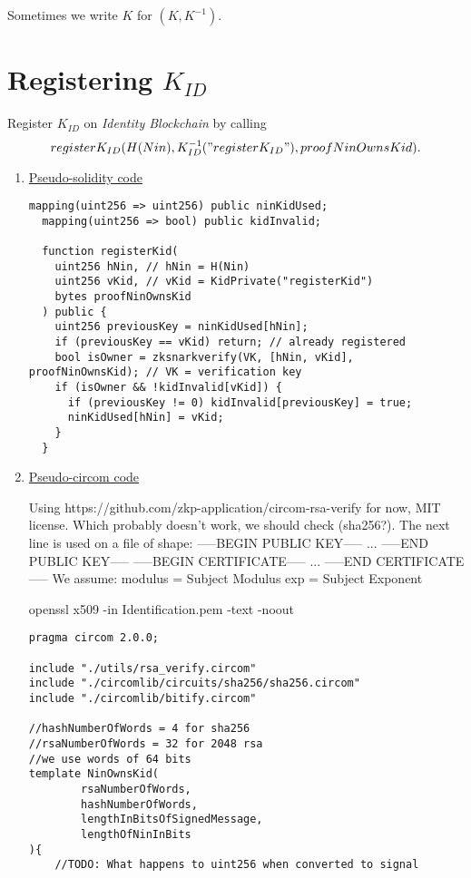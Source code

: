 \documentclass{article}
\newcommand{\kid}{K_{ID}}
\newcommand{\pbc}{\textit{Identity Blockchain}}
\begin{document}
Sometimes we write $K$ for $(K, K^{-1})$.

\newpage
\section{Registering $\kid$}
Register $\kid$ on \pbc{} by calling $$register\kid(H(Nin), \kid^{-1}("register\kid"), proofNinOwnsKid).$$
\begin{enumerate}[leftmargin=0cm]
\item[] \underline{Pseudo-solidity code}

\hfill\begin{minipage}{\dimexpr\textwidth-20px}
\begin{lstlisting}[language=Solidity]
  mapping(uint256 => uint256) public ninKidUsed;
  mapping(uint256 => bool) public kidInvalid;

  function registerKid(
    uint256 hNin, // hNin = H(Nin)
    uint256 vKid, // vKid = KidPrivate("registerKid")
    bytes proofNinOwnsKid
  ) public {
    uint256 previousKey = ninKidUsed[hNin];
    if (previousKey == vKid) return; // already registered
    bool isOwner = zksnarkverify(VK, [hNin, vKid], proofNinOwnsKid); // VK = verification key
    if (isOwner && !kidInvalid[vKid]) {
      if (previousKey != 0) kidInvalid[previousKey] = true;
      ninKidUsed[hNin] = vKid;
    }
  }
\end{lstlisting}
\xdef\tpd{\the\prevdepth}
\end{minipage}

\item[] \underline{Pseudo-circom code}

\hfill\begin{minipage}{\dimexpr\textwidth-20px}
Using https://github.com/zkp-application/circom-rsa-verify for now, MIT license.
Which probably doesn't work, we should check (sha256?).
The next line is used on a file of shape:
-----BEGIN PUBLIC KEY-----
...
-----END PUBLIC KEY-----
-----BEGIN CERTIFICATE-----
...
-----END CERTIFICATE-----
We assume: 
	modulus = Subject Modulus
	exp = Subject Exponent

openssl x509 -in Identification.pem -text -noout

\begin{lstlisting}[language=circom]
pragma circom 2.0.0;

include "./utils/rsa_verify.circom"
include "./circomlib/circuits/sha256/sha256.circom"
include "./circomlib/bitify.circom"

//hashNumberOfWords = 4 for sha256
//rsaNumberOfWords = 32 for 2048 rsa
//we use words of 64 bits
template NinOwnsKid(
		rsaNumberOfWords, 
		hashNumberOfWords, 
		lengthInBitsOfSignedMessage,
		lengthOfNinInBits
){
	//TODO: What happens to uint256 when converted to signal


\end{lstlisting}
\end{minipage}
\end{enumerate}
\end{document}
